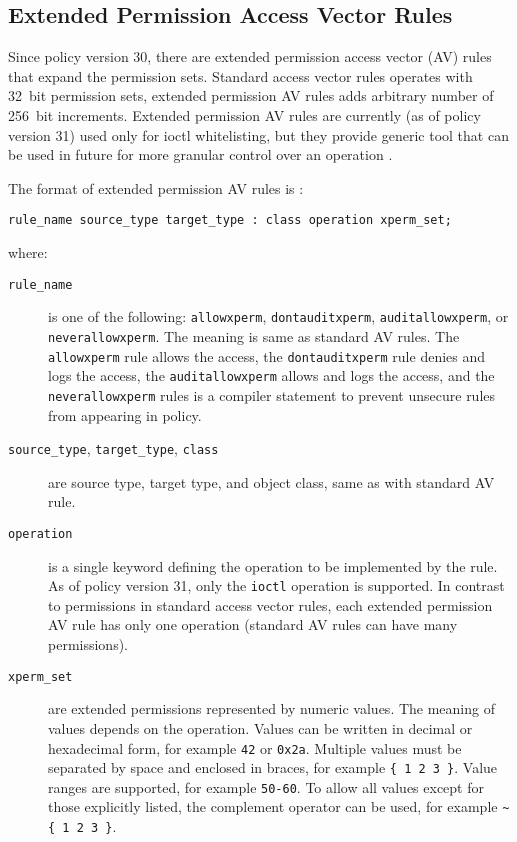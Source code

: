 \subsection{Extended Permission Access Vector Rules}
\label{extavrules}

Since policy version 30, there are extended permission access vector (AV) rules
that expand the permission sets. Standard access vector rules operates with
32~bit permission sets, extended permission AV rules adds arbitrary number of
256~bit increments. Extended permission AV rules are currently (as of policy
version 31) used only for ioctl whitelisting, but they provide generic tool that
can be used in future for more granular control over an operation
\cite{selinuxmailxperms}.

The format of extended permission AV rules is \cite{xpermrules}:
\begin{lstlisting}
rule_name source_type target_type : class operation xperm_set;
\end{lstlisting}
where:
\begin{description}
    \item [\texttt{rule\_name}] is one of the following: \texttt{allowxperm},
        \texttt{dontauditxperm}, \texttt{auditallowxperm}, or
        \texttt{neverallowxperm}. The meaning is same as standard AV rules. The
        \texttt{allowxperm} rule allows the access, the \texttt{dontauditxperm}
        rule denies and logs the access, the \texttt{auditallowxperm} allows and
        logs the access, and the \texttt{neverallowxperm} rules is a compiler
        statement to prevent unsecure rules from appearing in policy.
    \item [\texttt{source\_type}, \texttt{target\_type}, \texttt{class}] are
        source type, target type, and object class, same as with standard AV
        rule.
    \item [\texttt{operation}] is a single keyword defining the operation to be
        implemented by the rule. As of policy version 31, only the
        \texttt{ioctl} operation is supported. In contrast to permissions in
        standard access vector rules, each extended permission AV rule has only
        one operation (standard AV rules can have many permissions).
    \item [\texttt{xperm\_set}] are extended permissions represented by numeric
        values. The meaning of values depends on the operation. Values can be
        written in decimal or hexadecimal form, for example \texttt{42} or
        \texttt{0x2a}. Multiple values must be separated by space and enclosed
        in braces, for example \texttt{\{ 1 2 3 \}}. Value ranges are supported,
        for example \texttt{50-60}. To allow all values except for those
        explicitly listed, the complement operator can be used, for example
        \texttt{\textasciitilde \{ 1 2 3 \}}.
\end{description}

